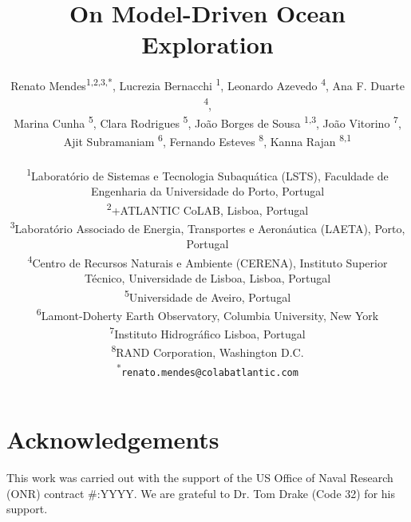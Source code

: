 \documentclass[11pt]{article}
\title{On Model-Driven Ocean Exploration}
\author{
Renato Mendes\textsuperscript{1,2,3,*},
Lucrezia Bernacchi \textsuperscript{1},
Leonardo Azevedo \textsuperscript{4},
Ana F. Duarte \textsuperscript{4},\\
Marina Cunha \textsuperscript{5},
Clara Rodrigues \textsuperscript{5},
João Borges de Sousa \textsuperscript{1,3},
João Vitorino \textsuperscript{7},\\
Ajit Subramaniam \textsuperscript{6},
Fernando Esteves \textsuperscript{8},
Kanna Rajan \textsuperscript{8,1}
\\
\\
\textsuperscript{1}{\scriptsize Laboratório de Sistemas e Tecnologia Subaquática (LSTS), Faculdade de Engenharia da Universidade do Porto, Portugal}\\
\textsuperscript{2}{\scriptsize +ATLANTIC CoLAB, Lisboa, Portugal}\\
\textsuperscript{3}{\scriptsize Laboratório Associado de Energia, Transportes e Aeronáutica (LAETA), Porto, Portugal}\\
\textsuperscript{4}{\scriptsize Centro de Recursos Naturais e Ambiente (CERENA), Instituto Superior T\'{e}cnico, Universidade de Lisboa, Lisboa, Portugal}\\
\textsuperscript{5}{\scriptsize Universidade de Aveiro, Portugal}\\
\textsuperscript{6}{\scriptsize Lamont-Doherty Earth Observatory, Columbia University, New York}\\
\textsuperscript{7}{\scriptsize Instituto Hidrogr{\'a}fico Lisboa, Portugal}\\
\textsuperscript{8}{\scriptsize RAND Corporation, Washington D.C.}\\
\textsuperscript{*}\texttt{{\scriptsize renato.mendes@colabatlantic.com}}
}
\date{}
\begin{document}
\maketitle






\section{Acknowledgements}

This work was carried out with the support of the US Office of Naval
Research (ONR) contract \#:YYYY. We are grateful to Dr. Tom Drake
(Code 32) for his support. 


\footnotesize{
  
}
\end{document}
